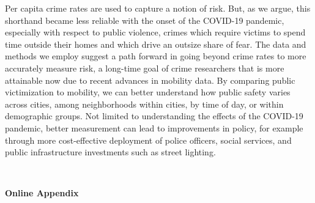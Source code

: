 \documentclass[12pt]{article}
\begin{document}

Per capita crime rates are used to capture a notion of risk. But, as we argue, this shorthand became less reliable with the onset of the COVID-19 pandemic, especially with respect to public violence, crimes which require victims to spend time outside their homes and which drive an outsize share of fear. The data and methods we employ suggest a path forward in going beyond crime rates to more accurately measure risk, a long-time goal of crime researchers that is more attainable now due to recent advances in mobility data. By comparing public victimization to mobility, we can better understand how public safety varies across cities, among neighborhoods within cities, by time of day, or within demographic groups. Not limited to understanding the effects of the COVID-19 pandemic, better measurement can lead to improvements in policy, for example through more cost-effective deployment of police officers, social services, and public infrastructure investments such as street lighting.  


\newpage
\singlespacing





\newpage 
%


\newpage 
\clearpage
\vspace*{90mm} \\
\begin{center}
\Huge{\textbf{Online Appendix}}
\end{center}

\newpage

%

\appendix 
\end{document}
